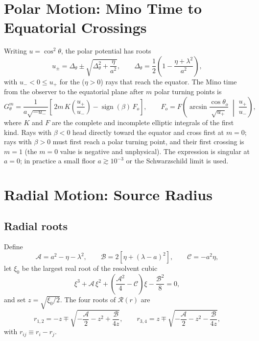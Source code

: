 \documentclass[11pt]{article}
\begin{document}
\section{Polar Motion: Mino Time to Equatorial Crossings}

Writing $u = \cos^2\theta$, the polar potential has roots
\begin{equation}
u_\pm = \Delta_\theta \pm \sqrt{\Delta_\theta^2 + \frac{\eta}{a^2}}, \qquad
\Delta_\theta = \frac12\left(1 - \frac{\eta + \lambda^2}{a^2}\right),
\end{equation}
with $u_- < 0 \le u_+$ for the ($\eta > 0$) rays that reach the equator.
The Mino time from the observer to the equatorial plane after $m$ polar
turning points is \cite{GL2020lensing,GLM2020}
\begin{equation}
G_\theta^{m} = \frac{1}{a\sqrt{-u_-}}\left[\,2m\,K\!\left(\frac{u_+}{u_-}\right) - \operatorname{sign}(\beta)\,F_o\right],
\qquad
F_o = F\!\left(\arcsin\frac{\cos\theta_o}{\sqrt{u_+}}\;\middle|\;\frac{u_+}{u_-}\right),
\label{eq:Gtheta}
\end{equation}
where $K$ and $F$ are the complete and incomplete elliptic integrals of the
first kind. Rays with $\beta < 0$ head directly toward the equator and cross
first at $m = 0$; rays with $\beta > 0$ must first reach a polar turning point,
and their first crossing is $m = 1$ (the $m = 0$ value is negative and
unphysical). The expression is singular at $a = 0$; in practice a small
floor $a \gtrsim 10^{-3}$ or the Schwarzschild limit is used.

\section{Radial Motion: Source Radius}

\subsection{Radial roots}

Define
\begin{equation}
\mathcal{A} = a^2 - \eta - \lambda^2, \qquad
\mathcal{B} = 2\left[\eta + (\lambda - a)^2\right], \qquad
\mathcal{C} = -a^2\eta,
\end{equation}
let $\xi_0$ be the largest real root of the resolvent cubic
\begin{equation}
\xi^3 + \mathcal{A}\,\xi^2 + \left(\frac{\mathcal{A}^2}{4} - \mathcal{C}\right)\xi - \frac{\mathcal{B}^2}{8} = 0,
\end{equation}
and set $z = \sqrt{\xi_0/2}$. The four roots of $\mathcal{R}(r)$ are
\cite{GL2020null}
\begin{equation}
r_{1,2} = -z \mp \sqrt{-\frac{\mathcal{A}}{2} - z^2 + \frac{\mathcal{B}}{4z}}, \qquad
r_{3,4} = z \mp \sqrt{-\frac{\mathcal{A}}{2} - z^2 - \frac{\mathcal{B}}{4z}},
\end{equation}
with $r_{ij} \equiv r_i - r_j$.
\end{document}
